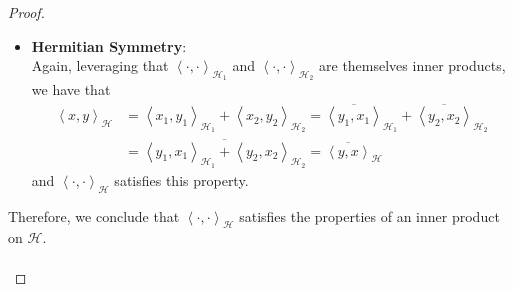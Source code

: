 \documentclass{article}
\newcommand{\hilbert}{\mathcal{H}}
\newcommand{\abracks}[1]{\left< #1\right>}
\begin{document}
\begin{proof}
\begin{itemize}
            \item \textbf{Hermitian Symmetry}:\\
            Again, leveraging that $\abracks{\cdot,\cdot}_{\hilbert_1}$ and  
            $\abracks{\cdot,\cdot}_{\hilbert_2}$ are themselves inner products, we 
            have that
            \begin{align*}
            \abracks{x,y}_\hilbert &= \abracks{x_1, y_1}_{\hilbert_1} + 
            \abracks{x_2,y_2}_{\hilbert_2} = \overline{\abracks{y_1, x_1}}_{\hilbert_1} + 
            \overline{\abracks{y_2,x_2}}_{\hilbert_2} \\
            &= \overline{\abracks{y_1, x_1}_{\hilbert_1} + \abracks{y_2,x_2}_{\hilbert_2}} 
            = \overline{\abracks{y, x}}_\hilbert 
            \end{align*}
            and $\abracks{\cdot, \cdot}_\hilbert$ satisfies this property.
        \end{itemize}

        Therefore, we conclude that $\abracks{\cdot,\cdot}_\hilbert$ satisfies the 
        properties of an inner product on $\hilbert$.\\\\


\end{proof}
\end{document}
